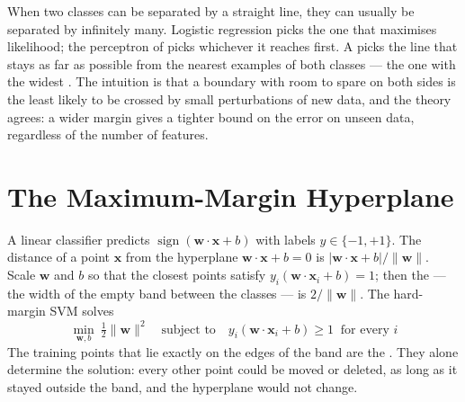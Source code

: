 When two classes can be separated by a straight line, they can usually be
separated by infinitely many. Logistic regression picks the one that maximises
likelihood; the perceptron of  picks whichever it reaches first. A
 picks the line that stays as far as possible from
the nearest examples of both classes --- the one with the widest .
The intuition is that a boundary with room to spare on both sides is the least
likely to be crossed by small perturbations of new data, and the theory agrees:
a wider margin gives a tighter bound on the error on unseen data, regardless of
the number of features.

\section{The Maximum-Margin Hyperplane}

\begin{definitionbox}
A linear classifier predicts $\operatorname{sign}(\mathbf{w}\cdot\mathbf{x} + b)$
with labels $y \in \{-1, +1\}$. The distance of a point $\mathbf{x}$ from the
hyperplane $\mathbf{w}\cdot\mathbf{x} + b = 0$ is
$|\mathbf{w}\cdot\mathbf{x} + b| / \|\mathbf{w}\|$. Scale $\mathbf{w}$ and $b$ so that
the closest points satisfy $y_i(\mathbf{w}\cdot\mathbf{x}_i + b) = 1$; then the
 --- the width of the empty band between the classes --- is
$2/\|\mathbf{w}\|$. The hard-margin SVM solves
\[
\min_{\mathbf{w}, b}\ \tfrac{1}{2}\|\mathbf{w}\|^2
\quad\text{subject to}\quad y_i(\mathbf{w}\cdot\mathbf{x}_i + b) \ge 1 \ \text{ for every } i
\]
The training points that lie exactly on the edges of the band are the
. They alone determine the solution: every other point could
be moved or deleted, as long as it stayed outside the band, and the hyperplane
would not change.
\end{definitionbox}

